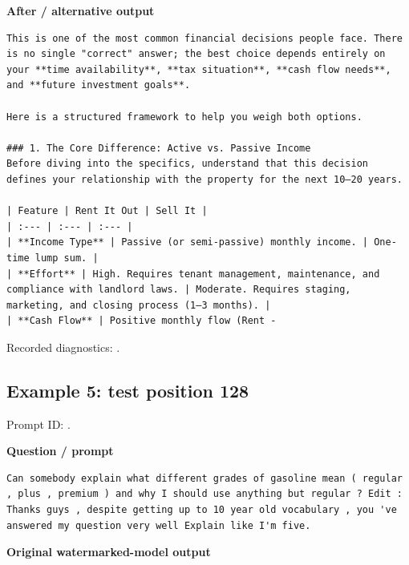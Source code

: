 \textbf{After / alternative output}

\begin{Verbatim}
This is one of the most common financial decisions people face. There is no single "correct" answer; the best choice depends entirely on your **time availability**, **tax situation**, **cash flow needs**, and **future investment goals**.

Here is a structured framework to help you weigh both options.

### 1. The Core Difference: Active vs. Passive Income
Before diving into the specifics, understand that this decision defines your relationship with the property for the next 10–20 years.

| Feature | Rent It Out | Sell It |
| :--- | :--- | :--- |
| **Income Type** | Passive (or semi-passive) monthly income. | One-time lump sum. |
| **Effort** | High. Requires tenant management, maintenance, and compliance with landlord laws. | Moderate. Requires staging, marketing, and closing process (1–3 months). |
| **Cash Flow** | Positive monthly flow (Rent -
\end{Verbatim}

Recorded diagnostics:
\texttt{}.

\subsection{Example 5: test position
128}\label{record-docs-watermarking-qualitative-text-latent-direct-topk-md-example-5-test-position-128}

Prompt ID:
\texttt{}.

\textbf{Question / prompt}

\begin{Verbatim}
Can somebody explain what different grades of gasoline mean ( regular , plus , premium ) and why I should use anything but regular ? Edit : Thanks guys , despite getting up to 10 year old vocabulary , you 've answered my question very well Explain like I'm five.
\end{Verbatim}

\textbf{Original watermarked-model output}

